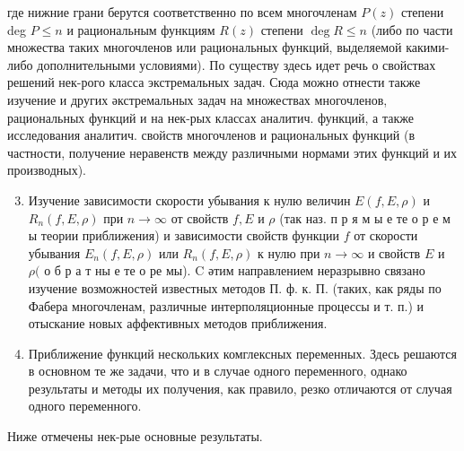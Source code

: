 \documentclass[10pt]{article}
\begin{document}
где нижние грани берутся соответственно по всем многочленам $P(z)$ степени deg $P \leqslant n$ и рациональным функциям $R(z)$ степени $\operatorname{deg} R \leqslant n$ (либо по части множества таких многочленов или рациональных функций, выделяемой какими-либо дополнительными условиями). По существу здесь идет речь о свойствах решений нек-рого класса экстремальных задач. Сюда можно отнести также изучение и других әкстремальных задач на множествах многочленов, рациональных функций и на нек-рых классах аналитич. функций, а также исследования аналитич. свойств многочленов и рациональных функций (в частности, получение неравенств между различными нормами этих функций и их производных).



\begin{enumerate}

  \setcounter{enumi}{2}

  \item Изучение зависимости скорости убывания к нулю величин $E(f, E, \rho)$ и $R_{n}(f, E, \rho)$ при $n \rightarrow \infty$ от свойств $f, E$ и $\rho$ (так наз. п р я м ы е те о р е м ы теории приближения) и зависимости свойств функции $f$ от скорости убывания $E_{n}(f, E, \rho)$ или $R_{n}(f, E, \rho)$ к нулю при $n \rightarrow \infty$ и свойств $E$ и $\rho($ о б р а т ны е те о ре мы). $\mathrm{C}$ әтим направлением неразрывно связано изучение возможностей известных методов П. ф. к. П. (таких, как ряды по Фабера многочленам, различные интерполяционные процессы и т. п.) и отыскание новых аффективных методов приближения.



  \item Приближение функций нескольких комглексных переменных. Здесь решаются в основном те же задачи, что и в случае одного переменного, однако результаты и методы их получения, как правило, резко отличаются от случая одного переменного.



\end{enumerate}



Ниже отмечены нек-рые основные результаты.
\end{document}
